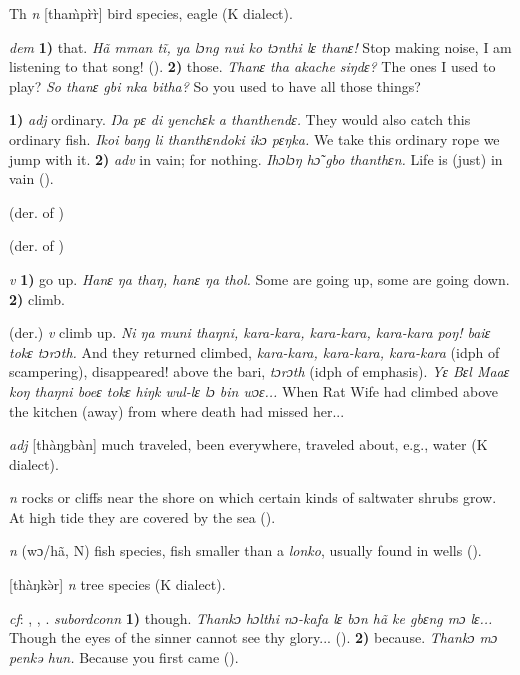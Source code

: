 \begin{letter}{Th}
 \textit{n} [tham̀pr̀r̀] bird species, eagle (K dialect).

 \textit{dem} \textbf{1)} that. \textit{Hã mman tĩ, ya lɔng nui ko tɔnthi lɛ thanɛ!} Stop making noise, I am listening to that song! (\citealt{Pichl1967}). \textbf{2)} those. \textit{Thanɛ tha akache siŋdɛ?} The ones I used to play? \textit{So thanɛ gbi nka bitha?} So you used to have all those things?

 \textbf{1)} \textit{adj} ordinary. \textit{Ŋa pɛ di yenchɛk a thanthendɛ.} They would also catch this ordinary fish. \textit{Ikoi baŋg li thanthɛndoki ikɔ pɛŋka.} We take this ordinary rope we jump with it. \textbf{2)} \textit{adv} in vain; for nothing. \textit{Ihɔlɔŋ hɔ̃ gbo thanthɛn.} Life is (just) in vain (\citealt{Pichl1967}).

 (der. of ) 

 (der. of ) 

 \textit{v} \textbf{1)} go up. \textit{Hanɛ ŋa thaŋ, hanɛ ŋa thol.} Some are going up, some are going down. \textbf{2)} climb.

 (der.) \textit{v} climb up. \textit{Ni ŋa muni thaŋni, kara-kara, kara-kara, kara-kara poŋ! baiɛ tokɛ tɔrɔth.} And they returned climbed, \textit{kara-kara, kara-kara, kara-kara} (idph of scampering), disappeared! above the bari, \textit{tɔrɔth} (idph of emphasis). \textit{Yɛ Bɛl Maaɛ koŋ thaŋni boeɛ tokɛ hiŋk wul-lɛ lɔ bin wɔɛ...} When Rat Wife had climbed above the kitchen (away) from where death had missed her...

 \textit{adj} [thàŋgbàn] much traveled, been everywhere, traveled about, e.g., water (K dialect).

 \textit{n} rocks or cliffs near the shore on which certain kinds of saltwater shrubs grow. At high tide they are covered by the sea (\citealt{Pichl1967}). 

 \textit{n} (wɔ/hã, N) fish species, fish smaller than a \textit{lonko}, usually found in wells (\citealt{Pichl1967}). 

 [thàŋkǝ̀r] \textit{n} tree species (K dialect). 

 \textit{cf}: , , . \textit{subordconn} \textbf{1)} though. \textit{Thankɔ hɔlthi nɔ-kafa lɛ bɔn hã ke gbɛng mɔ lɛ...} Though the eyes of the sinner cannot see thy glory... (\citealt{Pichl1967}). \textbf{2)} because. \textit{Thankɔ mɔ penkə hun.} Because you first came (\citealt{Pichl1967}). 


\end{letter}
